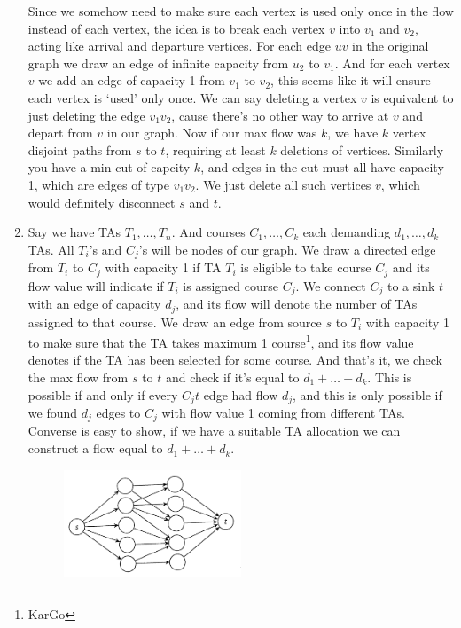 \documentclass[12pt]{report}
\begin{document}
\begin{enumerate}[label=\textbf{\arabic*.}]
  Since we somehow need to make sure each vertex is used only once in the flow instead of each vertex, the idea is to break each vertex $v$ 
  into $v_1$ and $v_2$, acting like arrival and departure vertices. For each edge $uv$ in the original graph we draw an edge of infinite capacity
  from $u_2$ to $v_1$. And for each vertex $v$ we add an edge of capacity 1 from $v_1$ to $v_2$, this seems like it will ensure each vertex is `used'
  only once. We can say deleting a vertex $v$ is equivalent to just deleting the edge $v_1 v_2$, cause there's no other way to arrive at $v$ 
  and depart from $v$ in our graph. Now if our max flow was $k$, we have $k$ vertex disjoint paths from $s$ to $t$, requiring at least $k$ deletions
  of vertices. Similarly you have a min cut of capcity $k$, and edges in the cut must all have capacity 1, which are edges of type $v_1 v_2$. We
  just delete all such vertices $v$, which would definitely disconnect $s$ and $t$.

  \item Say we have TAs $T_1, \dots, T_n$. And courses $C_1, \dots, C_k$ each demanding $d_1, \dots, d_k$ TAs. All $T_i$'s and $C_j$'s will be nodes 
  of our graph. We draw a directed edge from $T_i$ to $C_j$ with capacity 1 if TA $T_i$ is eligible to take course $C_j$ and its flow value will
  indicate if $T_i$ is assigned course $C_j$. We connect $C_j$ to a sink
  $t$ with an edge of capacity $d_j$, and its flow will denote the number of TAs assigned to that course. We draw an edge from source $s$ to $T_i$
  with capacity 1 to make sure that the TA takes maximum 1 course\footnote{KarGo }, and its flow value denotes if the TA has 
  been selected for some course. And that's it, we check the max flow from $s$ to $t$ and check if it's equal to $d_1 + \dots + d_k$. This is possible 
  if and only if every $C_j t$ edge had flow $d_j$, and this is only possible if we found $d_j$ edges to $C_j$ with flow value 1 coming from different 
  TAs. Converse is easy to show, if we have a suitable TA allocation we can construct a flow equal to $d_1 + \dots + d_k$.

  \begin{figure}[H]
    \centering
    \includegraphics[width=0.5\textwidth]{TAallocation.png}  
  \end{figure}


\end{enumerate}
\end{document}
